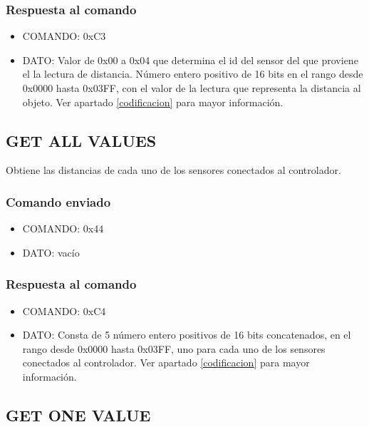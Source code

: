 \documentclass[a4paper,10pt]{article}
\begin{document}
\subsubsection*{Respuesta al comando}

\begin{itemize}
	\item{COMANDO:} 0xC3
	\item{DATO:} Valor de 0x00 a 0x04 que determina el id del sensor del que proviene el la lectura de distancia.
		N\'umero entero positivo de 16 bits en el rango desde 0x0000 hasta 0x03FF, con el valor de la lectura que representa la distancia al objeto.
		Ver apartado \ref{codificacion} para mayor informaci\'on.
\end{itemize}

\subsection{GET ALL VALUES}
\label{get_all_values_us}

Obtiene las distancias de cada uno de los sensores conectados al controlador.

\subsubsection*{Comando enviado}

\begin{itemize}
	\item{COMANDO:} 0x44
	\item{DATO:} vac\'io
\end{itemize}

\subsubsection*{Respuesta al comando}

\begin{itemize}
	\item{COMANDO:} 0xC4
	\item{DATO:} Consta de 5 n\'umero entero positivos de 16 bits concatenados, en el rango desde 0x0000 hasta 0x03FF,
		uno para cada uno de los sensores conectados al controlador.
		Ver apartado \ref{codificacion} para mayor informaci\'on.
\end{itemize}

\subsection{GET ONE VALUE}
\label{get_one_value_us}
\end{document}
